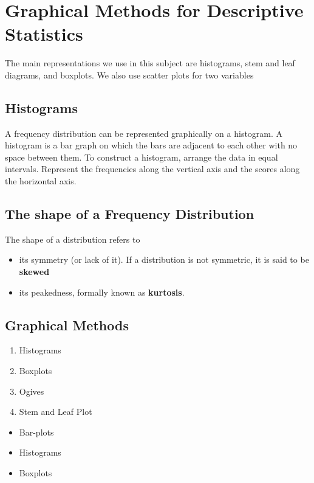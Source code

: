 \documentclass[]{report}
\begin{document}

	\section{Graphical Methods for Descriptive Statistics}
	The main representations we use in this subject are histograms, stem and leaf diagrams, and boxplots. We also use scatter plots for two variables
	
	\subsection{Histograms}
	
	A frequency distribution can be represented graphically on a histogram. A histogram is a bar graph on which the bars are adjacent to each other with no space between them. To construct a histogram, arrange the data in equal intervals. Represent the frequencies along the vertical axis and the scores along the horizontal axis. 
	
	
	\subsection{The shape of a Frequency Distribution}
	
	The shape of a distribution refers to 
	\begin{itemize}
		\item its symmetry (or lack of it). If a distribution is not symmetric, it is said to be \textbf{skewed}
		\item its peakedness, formally known as \textbf{kurtosis}.
	\end{itemize}
	
	
	\subsection{Graphical Methods}
	\begin{multicols}{2}
		\begin{enumerate}
			\item Histograms
			\item Boxplots
			\item Ogives
			\item Stem and Leaf Plot
		\end{enumerate}
	\end{multicols}
	
	
\begin{itemize}
	\item Bar-plots
	\item Histograms
	\item Boxplots
	
\end{itemize}
\end{document}
